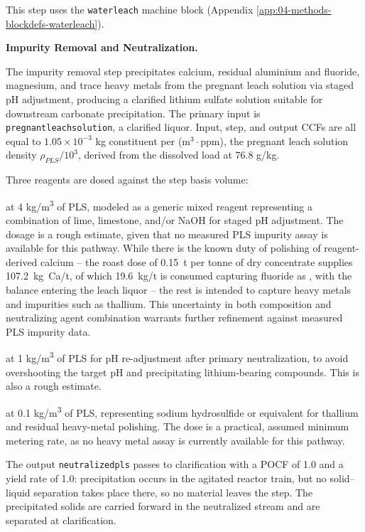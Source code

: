 \documentclass{article}
\renewcommand\_{\textunderscore\allowbreak}
\begin{document}
This step uses the \texttt{water\_leach} machine block (Appendix \ref{app:04-methods-blockdefs-waterleach}).

\medskip
\noindent\textbf{Impurity Removal and Neutralization.}\quad

The impurity removal step precipitates calcium, residual aluminium and fluoride, magnesium, and trace heavy metals from the pregnant leach solution via staged pH adjustment, producing a clarified lithium sulfate solution suitable for downstream carbonate precipitation. The primary input is \texttt{pregnant\_leach\_solution}, a clarified liquor. Input, step, and output CCFs are all equal to $1.05 \times 10^{-3}$ kg constituent per (m$^{3} \cdot$ppm), the pregnant leach solution density  $\rho_{PLS}/10^3$, derived from the dissolved load at 76.8 g/kg. 
 
Three reagents are dosed against the step basis volume:
 
\begin{description}[noitemsep, topsep=0pt]
\item[\textbullet\enskip Neutralizing agent] at 4 \si{kg/m^3} of PLS, modeled as a generic mixed reagent representing a combination of lime, limestone, and/or NaOH for staged pH adjustment. The dosage is a rough estimate, given that no measured PLS impurity assay is available for this pathway. While there is the known duty of polishing of reagent-derived calcium -- the roast dose of 0.15~t  per tonne of dry concentrate supplies 107.2~kg~Ca/t, of which 19.6~kg/t is consumed capturing fluoride as , with the balance entering the leach liquor -- the rest is intended to capture heavy metals and impurities such as thallium. This uncertainty in both composition and neutralizing agent combination warrants further refinement against measured PLS impurity data.
\item[\textbullet\enskip Sulfuric acid] at 1 \si{kg/m^3} of PLS for pH re-adjustment after primary neutralization, to avoid overshooting the target pH and precipitating lithium-bearing compounds. This is also a rough estimate.
\item[\textbullet\enskip Sulfide precipitant] at 0.1 \si{kg/m^3} of PLS, representing sodium hydrosulfide or equivalent for thallium and residual heavy-metal polishing. The dose is a practical, assumed minimum metering rate, as no heavy metal assay is currently available for this pathway. 
\end{description}

The output \texttt{neutralized\_pls} passes to clarification with a POCF of 1.0 and a yield rate of 1.0: precipitation occurs in the agitated reactor train, but no solid--liquid separation takes place there, so no material leaves the step. The precipitated solids are carried forward in the neutralized stream and are separated at clarification.
\end{document}
